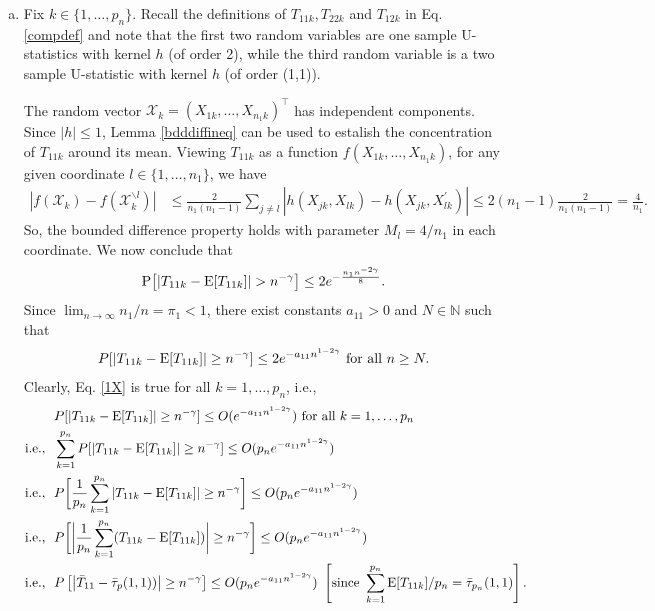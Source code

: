 \documentclass[twoside]{article}
\newcommand{\0}{\mathbf{0}}
\newcommand{\1}{\mathbf{1}}
\numberwithin{equation}{section}
\begin{document}
\begin{enumerate}[(a)]
 \item Fix $k\in\{1,\ldots,p_n\}$. Recall the definitions of ${T}_{11k},{T}_{22k}$ and ${T}_{12k}$ in Eq. \eqref{compdef} and note that the first two random variables are one sample U-statistics with kernel $h$ (of order 2), while the third random variable is a two sample U-statistic with kernel $h$ (of order (1,1)).

The random vector $\mathcal{X}_k=(X_{1k},\ldots,X_{n_1k})^\top$ has independent components. Since $|h|\leq 1$, Lemma \ref{bdddiffineq} can be used to estalish the concentration of $T_{11k}$ around its mean. Viewing $T_{11k}$ as a function $f(X_{1k},\ldots,X_{n_1k})$, for any given coordinate $l\in\{1,\ldots, n_1\}$, we have
\begin{align*}
 |f(\mathcal{X}_k)-f(\mathcal{X}_k^{\backslash l})|&\leq \frac{2}{n_1(n_1-1)}\sum\limits_{j\neq l}|h(X_{jk},X_{lk})-h(X_{jk},X^\prime_{lk})|\leq 2(n_1-1)\frac{2}{n_1(n_1-1)}=\frac{4}{n_1}.
\end{align*}
So, the bounded difference property holds with parameter $M_l=4/n_1$ in each coordinate. We now conclude that
\begin{align}\label{0X}
 {\rm P}\big [|{T}_{11k}-{\rm E}[{T}_{11k}]|>n^{-\gamma} \big]\leq 2e^{- \frac{n_1 n^{-2\gamma}}{8}}.
\end{align}
Since $\lim_{n\to\infty}n_1/n=\pi_1<1$, there exist  constants $a_{11}>0$ and $N\in\mathbb{N}$ such that
\begin{align}\label{1X}
 P[|{T}_{11k} - {\rm E}[{T}_{11k}]|\geq n^{-\gamma}]\leq 2e^{-{a_{11} n^{1-2\gamma}}}\text{ for all }n\geq N.
\end{align}
Clearly, Eq. \eqref{1X} is true for all $k=1,\ldots, p_n$, i.e.,
\begin{align}\label{ref11}
 &\ P[|{T}_{11k} - {\rm E}[ {T}_{11k}]|\geq n^{-\gamma}]\leq O(e^{-{a_{11} n^{1-2\gamma}}})\text{ for all }k=1,\ldots,p_n\nonumber \\
 \text{i.e., }&\ \sum\limits_{k=1}^{p_n}P[|{T}_{11k} - {\rm E}[ {T}_{11k}]|\geq n^{-\gamma}]\leq O(p_n e^{-{a_{11} n^{1-2\gamma}}})\nonumber \\
 \text{i.e., }&\ P\bigg [\frac{1}{p_n}\sum\limits_{k=1}^{p_n}|{T}_{11k} - {\rm E}[ {T}_{11k}]|\geq n^{-\gamma} \bigg]\leq O(p_n e^{-{a_{11} n^{1-2\gamma}}})\nonumber \\
 \text{i.e., }&\ P\bigg [\bigg |\frac{1}{p_n}\sum\limits_{k=1}^{p_n}({T}_{11k} - {\rm E}[ {T}_{11k}])\bigg |\geq n^{-\gamma} \bigg]\leq O(p_n e^{-{a_{11} n^{1-2\gamma}}})\nonumber \\
 \text{i.e., }&\ P \left [ \left |\bar{T}_{11} - \bar{\tau}_p(1,1)) \right |\geq n^{-\gamma} \right ]\leq O(p_n e^{-{a_{11} n^{1-2\gamma}}})\ \left [\text{since }\sum_{k=1}^{p_n}{\rm E}[ {T}_{11k}]/p_n = \bar{\tau}_{p_n}(1,1)\right ].
\end{align}


\end{enumerate}
\end{document}

